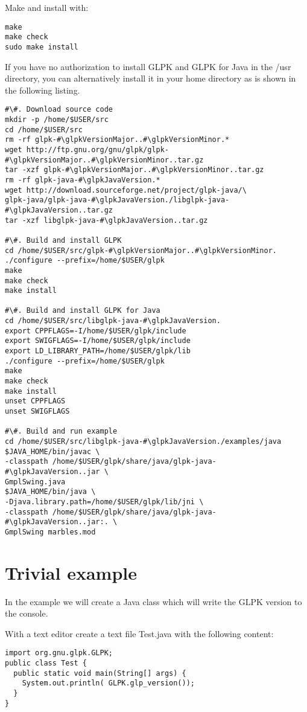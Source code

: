 \documentclass[a4paper,11pt]{report}
\newcommand{\glpkJavaVersion}{1.8.0}
\newcommand{\glpkVersionMajor}{4}
\newcommand{\glpkVersionMinor}{61}
\begin{document}
Make and install with:

\begin{lstlisting}
make
make check
sudo make install
\end{lstlisting}

If you have no authorization to install GLPK and GLPK
for Java in the /usr directory, you can alternatively install it in your home
directory as is shown in the following listing.

\begin{lstlisting}
#\#. Download source code
mkdir -p /home/$USER/src
cd /home/$USER/src
rm -rf glpk-#\glpkVersionMajor..#\glpkVersionMinor.*
wget http://ftp.gnu.org/gnu/glpk/glpk-#\glpkVersionMajor..#\glpkVersionMinor..tar.gz
tar -xzf glpk-#\glpkVersionMajor..#\glpkVersionMinor..tar.gz
rm -rf glpk-java-#\glpkJavaVersion.*
wget http://download.sourceforge.net/project/glpk-java/\
glpk-java/glpk-java-#\glpkJavaVersion./libglpk-java-#\glpkJavaVersion..tar.gz
tar -xzf libglpk-java-#\glpkJavaVersion..tar.gz

#\#. Build and install GLPK
cd /home/$USER/src/glpk-#\glpkVersionMajor..#\glpkVersionMinor.
./configure --prefix=/home/$USER/glpk
make
make check
make install

#\#. Build and install GLPK for Java
cd /home/$USER/src/libglpk-java-#\glpkJavaVersion.
export CPPFLAGS=-I/home/$USER/glpk/include
export SWIGFLAGS=-I/home/$USER/glpk/include
export LD_LIBRARY_PATH=/home/$USER/glpk/lib
./configure --prefix=/home/$USER/glpk
make
make check
make install
unset CPPFLAGS
unset SWIGFLAGS

#\#. Build and run example
cd /home/$USER/src/libglpk-java-#\glpkJavaVersion./examples/java
$JAVA_HOME/bin/javac \
-classpath /home/$USER/glpk/share/java/glpk-java-#\glpkJavaVersion..jar \
GmplSwing.java
$JAVA_HOME/bin/java \
-Djava.library.path=/home/$USER/glpk/lib/jni \
-classpath /home/$USER/glpk/share/java/glpk-java-#\glpkJavaVersion..jar:. \
GmplSwing marbles.mod
\end{lstlisting}

\section{Trivial example}

In the example we will create a Java class which will write the GLPK version to the console.

With a text editor create a text file Test.java with the following content:

\begin{lstlisting}
import org.gnu.glpk.GLPK;
public class Test {
  public static void main(String[] args) {
    System.out.println( GLPK.glp_version());
  }
}
\end{lstlisting}
\end{document}
